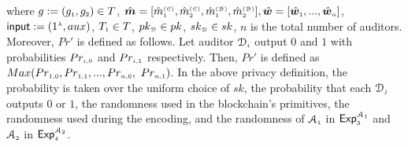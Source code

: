 \begin{definition}[Privacy]
\begin{enumerate}
%  
% 
where  $g:=(g_{\scriptscriptstyle 1}, g_{\scriptscriptstyle 2})\in T$,   $\hat {\bm m}=[\hat {m}^{\scriptscriptstyle (\mathcal{C})}_{\scriptscriptstyle 1}, \hat {m}^{\scriptscriptstyle (\mathcal{C})}_{\scriptscriptstyle 2}, \hat {m}^{\scriptscriptstyle (\mathcal{B})}_{\scriptscriptstyle 1}, \hat {m}^{\scriptscriptstyle (\mathcal{B})}_{\scriptscriptstyle 2}], \hat {\bm w}=[\hat {\bm w}_{\scriptscriptstyle 1},..., \hat{\bm w}_{\scriptscriptstyle n}]$, $\mathsf{input}:=(1^{\scriptscriptstyle\lambda}, aux)$, $T_{\scriptscriptstyle 1}\in T$, $pk_{\scriptscriptstyle \mathcal{D}}\in pk$, $sk_{\scriptscriptstyle \mathcal{D}}\in sk$, $n$ is the total number of auditors. Moreover, $Pr'$ is defined as follows. Let auditor $\mathcal{D}_{\scriptscriptstyle i}$ output $0$ and $1$ with probabilities $Pr_{\scriptscriptstyle i,0}$ and $Pr_{\scriptscriptstyle i,1}$ respectively. Then, $Pr'$ is defined as  $Max(Pr_{\scriptscriptstyle 1,0},Pr_{\scriptscriptstyle 1,1}, ..., Pr_{\scriptscriptstyle n,0}, $ $Pr_{\scriptscriptstyle n,1} )$. In the above privacy definition, the probability is taken over the uniform choice of $sk$, the probability that each  $\mathcal{D}_{\scriptscriptstyle j}$ outputs $0$ or $1$, the randomness used in the blockchain's primitives,  the randomness used during the encoding, and  the randomness of $\mathcal{A}_{\scriptscriptstyle 1}$ in $\mathsf{Exp}_{\scriptscriptstyle 3}^{\mathcal{A}_{\scriptscriptstyle 1}}$ and $\mathcal{A}_{\scriptscriptstyle 2}$ in $\mathsf{Exp}_{\scriptscriptstyle 4}^{\mathcal{A}_{\scriptscriptstyle 2}}$. 


\end{enumerate}
\end{definition}